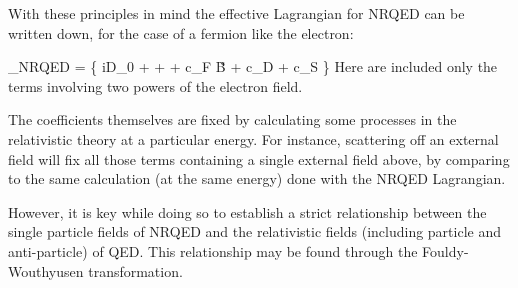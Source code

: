 With these principles in mind the effective Lagrangian for NRQED can be written down, for the case of a fermion like the electron:  

\beq \label{eq:nrLfermion}
_{NRQED} =  \fnrb \Bigg\{
		iD_0 +    + 	
		 + c_F  \gv{\sigma} \cdot \v{B} 
		+ c_D  
	 + c_S 
		\Bigg \} \fnr
\eeq
Here are included only the terms involving two powers of the electron field.

The coefficients themselves are fixed by calculating some processes in the relativistic theory at a particular energy.  For instance, scattering off an external field will fix all those terms containing a single external field above, by comparing to the same calculation (at the same energy) done with the NRQED Lagrangian.  

However, it is key while doing so to establish a strict relationship between the single particle fields of NRQED and the relativistic fields (including particle and anti-particle) of QED.  This relationship may be found through the Fouldy-Wouthyusen transformation.